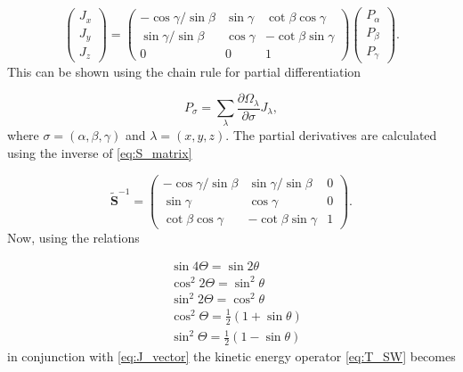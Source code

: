 \begin{equation}
\begin{pmatrix}
J_x\\
J_y\\
J_z
\end{pmatrix} =
\begin{pmatrix}
-\cos\gamma/\sin\beta & \sin\gamma & \cot\beta \cos\gamma\\
\sin\gamma/\sin\beta & \cos\gamma & -\cot\beta \sin\gamma\\
0 & 0 & 1
\end{pmatrix}
\begin{pmatrix}
P_{\alpha}\\
P_{\beta}\\
P_{\gamma}
\end{pmatrix}.
\end{equation} 
This can be shown using the chain rule for partial differentiation

\begin{equation}
P_{\sigma} = \sum_{\lambda} \frac{\partial \Omega_{\lambda}}{\partial \sigma} J_{\lambda},
\end{equation}
where $\sigma = (\alpha,\beta,\gamma)$ and $\lambda = (x,y,z)$. The partial derivatives are calculated using the inverse of \eqref{eq:S_matrix}

\begin{equation}\label{eq:S_matrix}
\tilde{\mathbf{S}}^{-1}=
\begin{pmatrix}
-\cos\gamma/\sin\beta & \sin\gamma/\sin\beta & 0\\
\sin\gamma  & \cos\gamma & 0\\
\cot\beta \cos\gamma  & -\cot\beta \sin\gamma  & 1
\end{pmatrix}.
\end{equation}
Now, using the relations

\begin{equation}
\begin{aligned}
&\sin 4\Theta   =\sin 2\theta\\
&\cos^2 2\Theta =\sin^2 \theta\\
&\sin^2 2\Theta =\cos^2 \theta\\
&\cos^2\Theta    =\frac{1}{2}(1+\sin\theta)\\
&\sin^2\Theta    =\frac{1}{2}(1-\sin\theta)
\end{aligned}
\end{equation}
in conjunction with \eqref{eq:J_vector} the kinetic energy operator \eqref{eq:T_SW} becomes

